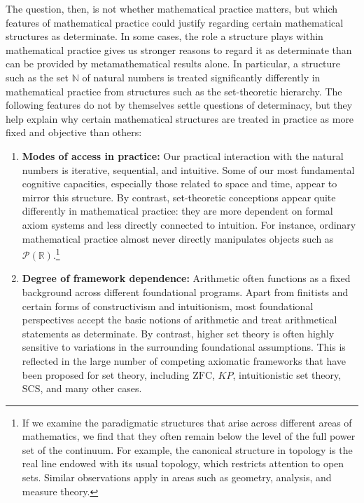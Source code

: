 \documentclass[11pt,a4paper]{article}
\theoremstyle{plain}
\begin{document}
The question, then, is not whether mathematical practice matters, but which features of mathematical practice could justify regarding certain mathematical structures as determinate. In some cases, the role a structure plays within mathematical practice gives us stronger reasons to regard it as determinate than can be provided by metamathematical results alone. In particular, a structure such as the set $\mathbb{N}$ of natural numbers is treated significantly differently in mathematical practice from structures such as the set-theoretic hierarchy. The following features do not by themselves settle questions of determinacy, but they help explain why certain mathematical structures are treated in practice as more fixed and objective than others:

\begin{enumerate}

  \item \textbf{Modes of access in practice:} Our practical interaction with the natural numbers is iterative, sequential, and intuitive. Some of our most fundamental cognitive capacities, especially those related to space and time, appear to mirror this structure. By contrast, set-theoretic conceptions appear quite differently in mathematical practice: they are more dependent on formal axiom systems and less directly connected to intuition. For instance, ordinary mathematical practice almost never directly manipulates objects such as $\mathcal{P}(\mathbb{R})$.\footnote{If we examine the paradigmatic structures that arise across different areas of mathematics, we find that they often remain below the level of the full power set of the continuum. For example, the canonical structure in topology is the real line endowed with its usual topology, which restricts attention to open sets. Similar observations apply in areas such as geometry, analysis, and measure theory.}

  \item \textbf{Degree of framework dependence:} Arithmetic often functions as a fixed background across different foundational programs. Apart from finitists and certain forms of constructivism and intuitionism, most foundational perspectives accept the basic notions of arithmetic and treat arithmetical statements as determinate. By contrast, higher set theory is often highly sensitive to variations in the surrounding foundational assumptions. This is reflected in the large number of competing axiomatic frameworks that have been proposed for set theory, including $\mathrm{ZFC}$, $KP$, intuitionistic set theory, $\mathrm{SCS}$, and many other cases.
  

\end{enumerate}
\end{document}
